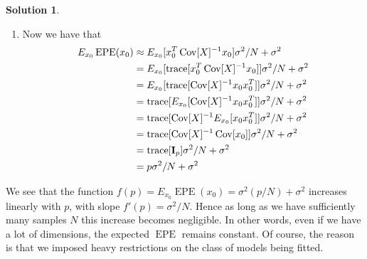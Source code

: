 \documentclass[]{book}
\theoremstyle{definition}
\newtheorem*{soln}{Solution}
\newcommand{\XX}{\mathbf{X}}
\DeclareMathOperator*{\EPE}{EPE} \DeclareMathOperator*{\Var}{Var}
\DeclareMathOperator*{\Bias}{Bias} \DeclareMathOperator*{\tr}{trace}
\begin{document}
\begin{enumerate}
\begin{soln}
{\begin{enumerate}
\begin{equation}
\begin{split}
						      &= x_0^T\beta + \sum_{i-1}^N\Exp[\ell_i(x_0)]\Exp[\varepsilon_i] \\
						      &= x_0^T\beta,
					      \end{split}
				      \end{equation}
				      since $\varepsilon_i$ is independent of $x_0$ and $\XX$.
				      Hence, $\Bias(\hat y_0)=\left(\Exp[\hat
						      y_0]-x_0^T\beta\right)=0$. Last, we want to calculate the
				      variance of our prediction $\Var[\hat y_0]$. We have
				      \begin{equation}
					      \begin{split}
						      \Var[\hat y_0] &= \Var[x_0^T\hat\beta] \\
						      &= x_0^T\Cov[\hat\beta]x_0 \\
						      &= x_0^T(\XX^T\XX)^{-1}\sigma^2x_0,
					      \end{split}
				      \end{equation}
				      where the last line comes from~\cref{eq:cov}.
				\item Now we have that
				      \begin{equation}
					      \begin{split}
						      E_{x_0}\EPE(x_0) &\approx E_{x_0}[x_0^T \Cov[X]^{-1}x_0]\sigma^2/N + \sigma^2 \\
						      &= E_{x_0}[\tr[x_0^T \Cov[X]^{-1}x_0]]\sigma^2/N + \sigma^2 \\
						      &= E_{x_0}[\tr[\Cov[X]^{-1}x_0x_0^T]]\sigma^2/N + \sigma^2 \\
						      &= \tr[E_{x_0}[\Cov[X]^{-1}x_0x_0^T]]\sigma^2/N + \sigma^2 \\
						      &= \tr[\Cov[X]^{-1}E_{x_0}[x_0x_0^T]]\sigma^2/N + \sigma^2 \\
						      &= \tr[\Cov[X]^{-1}\Cov[x_0]]\sigma^2/N + \sigma^2 \\
						      &= \tr[\mathbf{I}_p]\sigma^2/N + \sigma^2 \\
						      &= p\sigma^2/N + \sigma^2
					      \end{split}
				      \end{equation}
			\end{enumerate}
		} We see that the function
		$f(p)=E_{x_0}\EPE(x_0)=\sigma^2(p/N)+\sigma^2$ increases linearly with
		$p$, with slope $f'(p)=\sigma^2/N$. Hence as long as we have
		sufficiently many samples $N$ this increase becomes negligible. In other
		words, even if we have a lot of dimensions, the expected $\EPE$ remains
		constant. Of course, the reason is that we imposed heavy restrictions on
		the class of models being fitted.
	\end{soln}


\end{enumerate}
\end{document}
